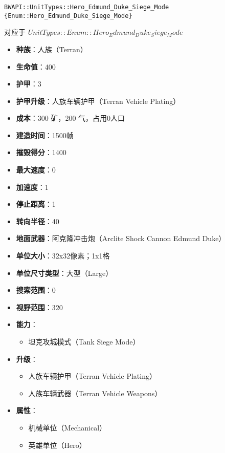 \begin{tcolorbox}[colback=white, colframe=black!60!white, title=Hero\_Edmund\_Duke\_Siege\_Mode(), arc=0mm]
    \begin{verbatim}
BWAPI::UnitTypes::Hero_Edmund_Duke_Siege_Mode {Enum::Hero_Edmund_Duke_Siege_Mode}
    \end{verbatim}
    对应于  $ UnitTypes::Enum::Hero_Edmund_Duke_Siege_Mode $ 
    \begin{itemize}
        \item \textbf{种族}：人族（Terran）
        \item \textbf{生命值}：400
        \item \textbf{护甲}：3
        \item \textbf{护甲升级}：人族车辆护甲（Terran Vehicle Plating）
        \item \textbf{成本}：300 矿，200 气，占用0人口
        \item \textbf{建造时间}：1500帧
        \item \textbf{摧毁得分}：1400
        \item \textbf{最大速度}：0
        \item \textbf{加速度}：1
        \item \textbf{停止距离}：1
        \item \textbf{转向半径}：40
        \item \textbf{地面武器}：阿克隆冲击炮（Arclite Shock Cannon Edmund Duke）
        \item \textbf{单位大小}：32x32像素；1x1格
        \item \textbf{单位尺寸类型}：大型（Large）
        \item \textbf{搜索范围}：0
        \item \textbf{视野范围}：320
        \item \textbf{能力}：
            \begin{itemize}
                \item 坦克攻城模式（Tank Siege Mode）
            \end{itemize}
        \item \textbf{升级}：
            \begin{itemize}
                \item 人族车辆护甲（Terran Vehicle Plating）
                \item 人族车辆武器（Terran Vehicle Weapons）
            \end{itemize}
        \item \textbf{属性}：
            \begin{itemize}
                \item 机械单位（Mechanical）
                \item 英雄单位（Hero）
            \end{itemize}
    \end{itemize}
\end{tcolorbox}


